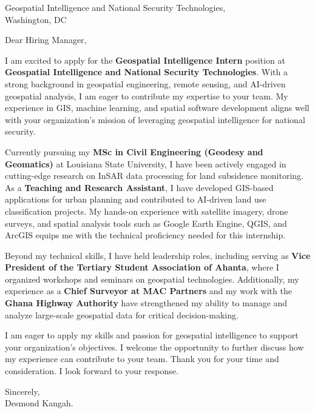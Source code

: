 \documentclass[a4paper,12pt]{letter}
\begin{document}
\begin{letter}{Geospatial Intelligence and National Security Technologies, \\ Washington, DC}

\opening{Dear Hiring Manager,}

I am excited to apply for the \textbf{Geospatial Intelligence Intern} position at \textbf{Geospatial Intelligence and National Security Technologies}. With a strong background in geospatial engineering, remote sensing, and AI-driven geospatial analysis, I am eager to contribute my expertise to your team. My experience in GIS, machine learning, and spatial software development aligns well with your organization's mission of leveraging geospatial intelligence for national security.

Currently pursuing my \textbf{MSc in Civil Engineering (Geodesy and Geomatics)} at Louisiana State University, I have been actively engaged in cutting-edge research on InSAR data processing for land subsidence monitoring. As a \textbf{Teaching and Research Assistant}, I have developed GIS-based applications for urban planning and contributed to AI-driven land use classification projects. My hands-on experience with satellite imagery, drone surveys, and spatial analysis tools such as Google Earth Engine, QGIS, and ArcGIS equips me with the technical proficiency needed for this internship.

Beyond my technical skills, I have held leadership roles, including serving as \textbf{Vice President of the Tertiary Student Association of Ahanta}, where I organized workshops and seminars on geospatial technologies. Additionally, my experience as a \textbf{Chief Surveyor at MAC Partners} and my work with the \textbf{Ghana Highway Authority} have strengthened my ability to manage and analyze large-scale geospatial data for critical decision-making.

I am eager to apply my skills and passion for geospatial intelligence to support your organization's objectives. I welcome the opportunity to further discuss how my experience can contribute to your team. Thank you for your time and consideration. I look forward to your response.

Sincerely, \\
Desmond Kangah.
\end{letter}
\end{document}
